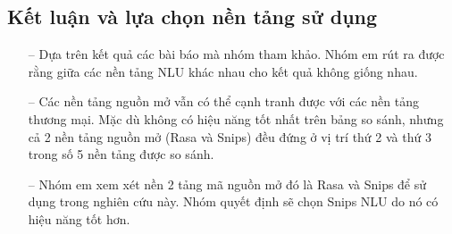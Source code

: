 \subsection{Kết luận và lựa chọn nền tảng sử dụng}

\begin{itemize}
    \item[--] Dựa trên kết quả các bài báo mà nhóm tham khảo. Nhóm em rút ra được rằng giữa các nền tảng NLU khác nhau cho kết quả không giống nhau.
    \item[--] Các nền tảng nguồn mở vẫn có thể cạnh tranh được với các nền tảng thương mại. Mặc dù không có hiệu năng tốt nhất trên bảng so sánh, nhưng cả 2 nền tảng nguồn mở (Rasa và Snips) đều đứng ở vị trí thứ 2 và thứ 3 trong số 5 nền tảng được so sánh.
    \item[--] Nhóm em xem xét nền 2 tảng mã nguồn mở đó là Rasa và Snips để sử dụng trong nghiên cứu này. Nhóm quyết định sẽ chọn Snips NLU do nó có hiệu năng tốt hơn.
\end{itemize}